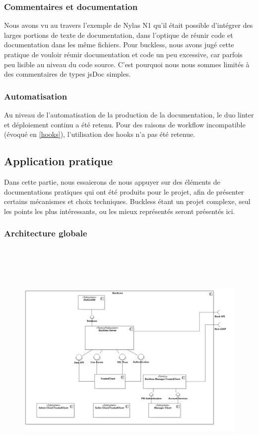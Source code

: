     \subsubsection{Commentaires et documentation}
        Nous avons vu au travers l'exemple de Nylas N1 qu'il était possible d'intégrer des larges
        portions de texte de documentation, dans l'optique de réunir code et documentation dans les
        même fichiers. Pour buckless, nous avons jugé cette pratique de vouloir réunir documentation
        et code un peu excessive, car parfois peu lisible au niveau du code source.
        C'est pourquoi nous nous sommes limités à des commentaires de types jsDoc simples.

    \subsubsection{Automatisation}
        Au niveau de l'automatisation de la production de la documentation, le duo linter et
        déploiement continu a été retenu. Pour des raisons de workflow incompatible (évoqué en
        \ref{hooks}), l'utilisation des hooks n'a pas été retenue.

\subsection{Application pratique}
    Dans cette partie, nous essaierons de nous appuyer sur des éléments de documentations pratiques
    qui ont été produits pour le projet, afin de présenter certains mécanismes et choix techniques.
    Buckless étant un projet complexe, seul  les points les plus intéressants, ou les mieux représentés
    seront présentés ici.

    \subsubsection{Architecture globale}
        \begin{figure}[h]
            \centering
            \includegraphics[height=12cm]{./assets/UML/system.png}
        \end{figure}

